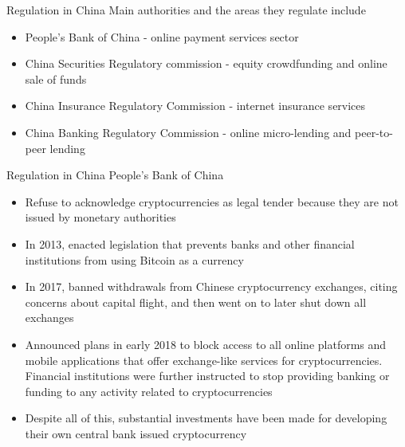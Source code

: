 \documentclass[11pt]{beamer}
\begin{document}

\begin{frame}{Regulation in China}
	Main authorities and the areas they regulate include
	\begin{itemize}
		\item People's Bank of China - online payment services sector
		\item China Securities Regulatory commission - equity crowdfunding and online sale of funds
		\item China Insurance Regulatory Commission - internet insurance services
		\item China Banking Regulatory Commission - online micro-lending and peer-to-peer lending
	\end{itemize}
\end{frame}


\begin{frame}{Regulation in China}
	People's Bank of China
	\begin{itemize}
		\item Refuse to acknowledge cryptocurrencies as legal tender because they are not issued by monetary authorities
		\item In 2013, enacted legislation that prevents banks and other financial institutions from using Bitcoin as a currency
		\item In 2017, banned withdrawals from Chinese cryptocurrency exchanges, citing concerns about capital flight, and then went on to later shut down all exchanges
		\item Announced plans in early 2018 to block access to all online platforms and mobile applications that offer exchange-like services for cryptocurrencies. Financial institutions were further instructed to stop providing banking or funding to any activity related to cryptocurrencies
		\item Despite all of this, substantial investments have been made for developing their own central bank issued cryptocurrency
	\end{itemize}
\end{frame}

\end{document}
